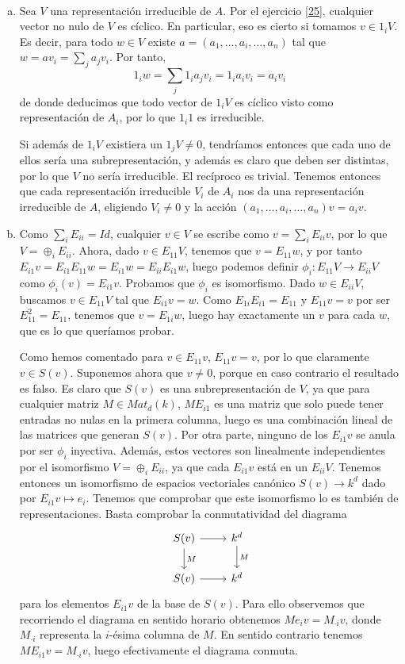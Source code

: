 \documentclass[twoside]{article}
\begin{document}
\begin{solucion}\
\begin{enumerate}[(a)]
\item Sea $V$ una representación irreducible de $A$. Por el ejercicio \ref{25}, cualquier vector no nulo de $V$ es cíclico. En particular, eso es cierto si tomamos $v\in 1_iV$. Es decir, para todo $w\in V$ existe $a=(a_1,\dots, a_i,\dots, a_n)$ tal que $w=av_i=\sum_j a_jv_i$. Por tanto, 
\[
1_iw=\sum_j 1_ia_jv_i=1_ia_iv_i=a_iv_i
\]
de donde deducimos que todo vector de $1_iV$ es cíclico visto como representación de $A_i$, por lo que $1_i1$ es irreducible. 

Si además de $1_iV$ existiera un $1_jV\neq 0$, tendríamos entonces que cada uno de ellos sería una subrepresentación, y además es claro que deben ser distintas, por lo que $V$ no sería irreducible. El recíproco es trivial. Tenemos entonces que cada representación irreducible $V_i$ de $A_i$ nos da una representación irreducible de $A$, eligiendo $V_i\neq 0$ y la acción $(a_1,\dots, a_i,\dots, a_n)v=a_iv$. 

\item Como $\sum_i E_{ii}=Id$, cualquier $v\in V$ se escribe como $v=\sum_i E_{ii}v$, por lo que $V=\oplus_i E_{ii}$. Ahora, dado $v\in E_{11}V$, tenemos que $v=E_{11}w$, y por tanto $E_{i1}v=E_{i1}E_{11}w=E_{i1}w=E_{ii}E_{i1}w$, luego podemos definir $\phi_i:E_{11}V\to E_{ii}V$ como $\phi_i(v)=E_{i1}v$. Probamos que $\phi_i$ es isomorfismo. Dado  $w\in E_{ii}V$, buscamos $v\in E_{11}V$ tal que $E_{i1}v=w$. Como $E_{1i}E_{i1}=E_{11}$ y $E_{11}v=v$ por ser $E_{11}^2=E_{11}$, tenemos que $v=E_{1i}w$, luego hay exactamente un $v$ para cada $w$, que es lo que queríamos probar. 

Como hemos comentado para $v\in E_{11}v$, $E_{11}v=v$, por lo que claramente $v\in S(v)$. Suponemos ahora que $v\neq 0$, porque en caso contrario el resultado es falso. Es claro que $S(v)$ es una subrepresentación de $V$, ya que para cualquier matriz $M\in Mat_d(k)$, $ME_{i1}$ es una matriz que solo puede tener entradas no nulas en la primera columna, luego es una combinación lineal de las matrices que generan $S(v)$. Por otra parte, ninguno de los $E_{i1}v$ se anula por ser $\phi_i$ inyectiva. Además, estos vectores son linealmente independientes por el isomorfismo $V=\oplus_iE_{ii}$, ya que cada $E_{i1}v$ está en un $E_{ii}V$. Tenemos entonces un isomorfismo de espacios vectoriales canónico $S(v)\to k^d$ dado por $E_{i1}v\mapsto e_i$. Tenemos que comprobar que este isomorfismo lo es también de representaciones. Basta comprobar la conmutatividad del diagrama
\[
\begin{tikzcd}
S(v)\arrow[r]\arrow[d, "M"] & k^d\arrow[d, "M"]\\
S(v)\arrow[r] & k^d
\end{tikzcd}
\]
para los elementos $E_{i1}v$ de la base de $S(v)$. Para ello observemos que recorriendo el diagrama en sentido horario obtenemos $Me_iv=M_{\cdot i}v$, donde $M_{\cdot i}$ representa la $i$-ésima columna de $M$. En sentido contrario tenemos $ME_{i1}v=M_{\cdot i}v$, luego efectivamente el diagrama conmuta. 


\end{enumerate}
\end{solucion}
\end{document}
